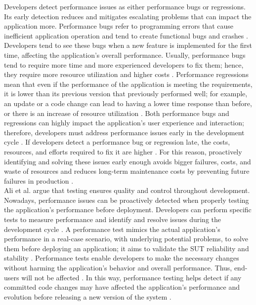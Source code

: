 Developers detect performance issues as either performance bugs or regressions. Its early detection reduces and mitigates escalating problems that can impact the application more. Performance bugs refer to programming errors that cause inefficient application operation and tend to create functional bugs and crashes \cite{nistor2013discovering}. Developers tend to see these bugs when a new feature is implemented for the first time, affecting the application’s overall performance. Usually, performance bugs tend to require more time and more experienced developers to fix them; hence, they require more resource utilization and higher costs \cite{bermbach2017quality}. Performance regressions mean that even if the performance of the application is meeting the requirements, it is lower than its previous version that previously performed well; for example, an update or a code change can lead to having a lower time response than before, or there is an increase of resource utilization \cite{nguyen2014industrial}. Both performance bugs and regressions can highly impact the application’s user experience and interaction; therefore, developers must address performance issues early in the development cycle \cite{chen2017exploratory, foo2010mining}. If developers detect a performance bug or regression late, the costs, resources, and efforts required to fix it are higher \cite{grambow2021usingApplication}. For this reason, proactively identifying and solving these issues early enough avoids bigger failures, costs, and waste of resources and reduces long-term maintenance costs by preventing future failures in production \cite{nistor2013discovering, shang2015automatedDetection}. \\
Ali et al. \cite{ali2022performance} argue that testing ensures quality and control throughout development. Nowadays, performance issues can be proactively detected when properly testing the application’s performance before deployment. Developers can perform specific tests to measure performance and identify and resolve issues during the development cycle \cite{ali2022performance}. A performance test mimics the actual application’s performance in a real-case scenario, with underlying potential problems, to solve them before deploying an application; it aims to validate the \ac{SUT} reliability and stability \cite{ali2022performance}. Performance tests enable developers to make the necessary changes without harming the application’s behavior and overall performance. Thus, end-users will not be affected \cite{alghmadi2016automated, chen2017exploratory, foo2010mining}. In this way, performance testing helps detect if any committed code changes may have affected the application’s performance and evolution before releasing a new version of the system \cite{alshoaibi2019DetectionofPerformance, shang2015automatedDetection}.  \\
